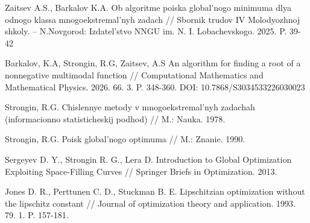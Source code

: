 \documentclass[11pt, oneside, a4paper]{article}
\begin{document}
\begin{biblioen}

Zaitsev A.S., Barkalov K.A. Ob algoritme poiska global'nogo minimuma dlya odnogo klassa mnogoekstremal'nyh zadach // Sbornik trudov IV Molodyozhnoj shkoly. -- N.Novgorod: Izdatel'stvo NNGU im. N. I. Lobachevskogo. 2025. P. 39-42

Barkalov, K.A, Strongin, R.G, Zaitsev, A.S An algorithm for finding a root of a nonnegative multimodal function // Computational Mathematics and Mathematical Physics. 2026. 66. 3. P. 348-360. DOI: 10.7868/S3034533226030023

Strongin, R.G. Chislennye metody v mnogoekstremal'nyh zadachah (informacionno statisticheskij podhod) // M.: Nauka. 1978.

Strongin, R.G. Poisk global'nogo optimuma // M.: Znanie. 1990.

Sergeyev D. Y., Strongin R. G., Lera D. Introduction to Global Optimization Exploiting Space-Filling Curves // Springer Briefs in Optimization. 2013.

Jones D. R., Perttunen C. D., Stuckman B. E. Lipschitzian optimization without the lipschitz constant // Journal of optimization theory and application. 1993. 79. 1. P. 157-181.





\end{biblioen}
\end{document}
